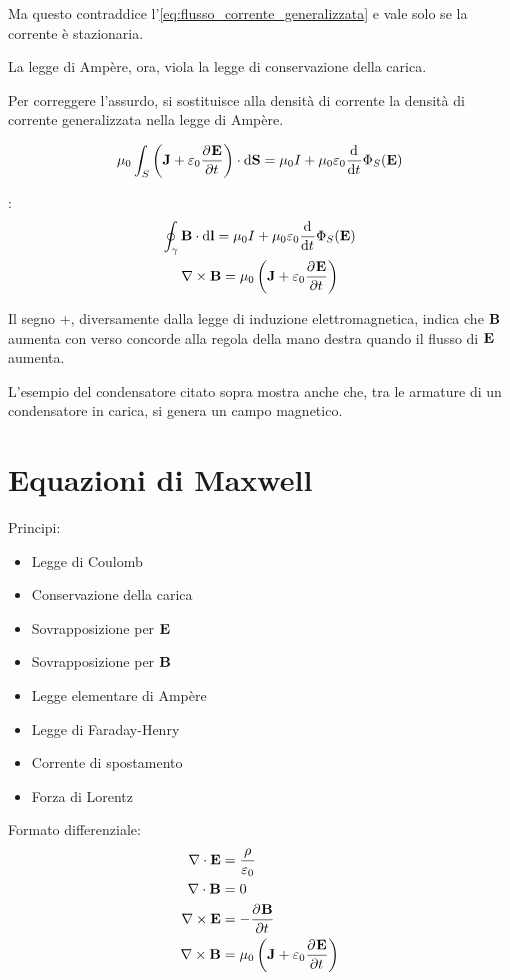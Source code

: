Ma questo contraddice l'\cref{eq:flusso_corrente_generalizzata} e vale solo se la corrente è stazionaria.

La legge di Ampère, ora, viola la legge di conservazione della carica.

Per correggere l'assurdo, si sostituisce alla densità di corrente la densità di corrente generalizzata nella legge di Ampère.

\begin{equation}
    \mu_0 \int_S \pts{\dcurr + \eps_0 \parder[\E]{t}} \sde
    = \mu_0 I + \mu_0\eps_0 \der{t} \Phi_S(\E)
\end{equation}

:
\begin{subequations}
\begin{gather}
    \oint_\gamma \B \lde
    = \mu_0 I + \mu_0\eps_0 \der{t} \Phi_S(\E) \\
    \curl \B = \mu_0 \pts{\dcurr + \eps_0 \parder[\E]{t}}
\end{gather}
\end{subequations}

Il segno $+$, diversamente dalla legge di induzione elettromagnetica, indica che $\mathbf{B}$ aumenta con verso concorde alla regola della mano destra quando il flusso di $\mathbf{E}$ aumenta.

L'esempio del condensatore citato sopra mostra anche che, tra le armature di un condensatore in carica, si genera un campo magnetico.

\section{Equazioni di Maxwell}

Principi:
\begin{itemize}
    \item Legge di Coulomb
    \item Conservazione della carica
    \item Sovrapposizione per $\mathbf{E}$
    \item Sovrapposizione per $\mathbf{B}$
    \item Legge elementare di Ampère
    \item Legge di Faraday-Henry
    \item Corrente di spostamento
    \item Forza di Lorentz
\end{itemize}
\medskip

Formato differenziale:
\begin{align}
    \diver \E & = \frac{\rho}{\eps_0} \\
    \diver \B & = 0 \\
    \curl \E & = - \parder[\B]{t} \\
    \curl \B & = \mu_0 \pts{\dcurr + \eps_0 \parder[\E]{t}}
\end{align}

